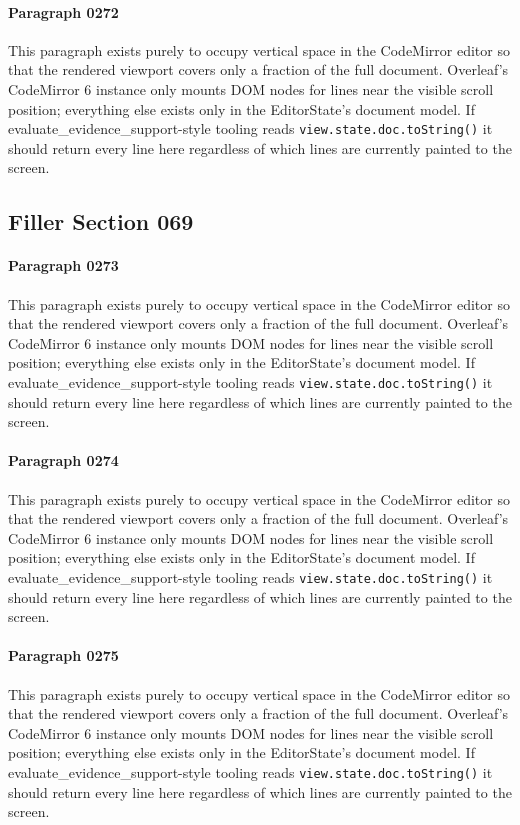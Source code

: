 \documentclass{article}
\begin{document}
\paragraph{Paragraph 0272}
This paragraph exists purely to occupy vertical space in the CodeMirror editor so that the rendered viewport covers only a fraction of the full document. Overleaf's CodeMirror 6 instance only mounts DOM nodes for lines near the visible scroll position; everything else exists only in the EditorState's document model. If evaluate\_evidence\_support-style tooling reads \texttt{view.state.doc.toString()} it should return every line here regardless of which lines are currently painted to the screen.

\subsection{Filler Section 069}
\paragraph{Paragraph 0273}
This paragraph exists purely to occupy vertical space in the CodeMirror editor so that the rendered viewport covers only a fraction of the full document. Overleaf's CodeMirror 6 instance only mounts DOM nodes for lines near the visible scroll position; everything else exists only in the EditorState's document model. If evaluate\_evidence\_support-style tooling reads \texttt{view.state.doc.toString()} it should return every line here regardless of which lines are currently painted to the screen.

\paragraph{Paragraph 0274}
This paragraph exists purely to occupy vertical space in the CodeMirror editor so that the rendered viewport covers only a fraction of the full document. Overleaf's CodeMirror 6 instance only mounts DOM nodes for lines near the visible scroll position; everything else exists only in the EditorState's document model. If evaluate\_evidence\_support-style tooling reads \texttt{view.state.doc.toString()} it should return every line here regardless of which lines are currently painted to the screen.

\paragraph{Paragraph 0275}
This paragraph exists purely to occupy vertical space in the CodeMirror editor so that the rendered viewport covers only a fraction of the full document. Overleaf's CodeMirror 6 instance only mounts DOM nodes for lines near the visible scroll position; everything else exists only in the EditorState's document model. If evaluate\_evidence\_support-style tooling reads \texttt{view.state.doc.toString()} it should return every line here regardless of which lines are currently painted to the screen.
\end{document}
